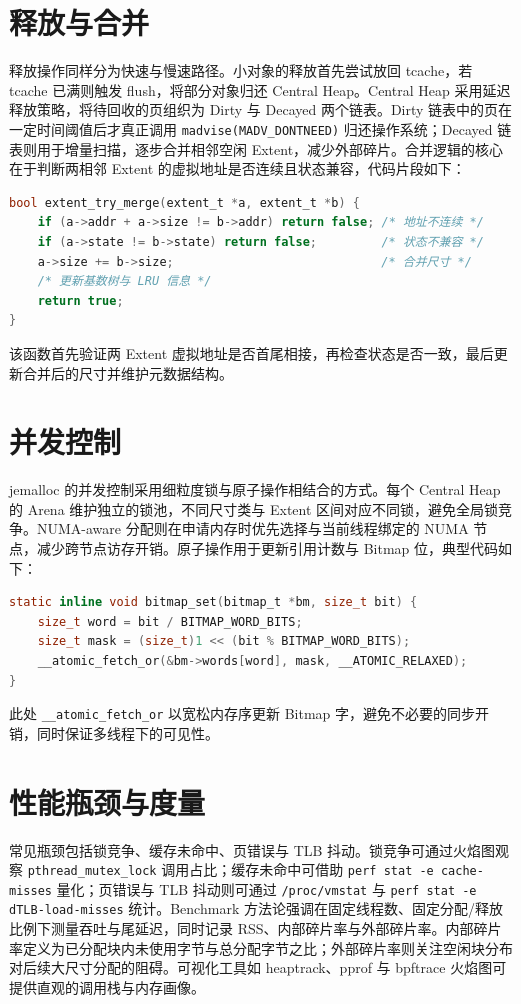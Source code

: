 \chapter{释放与合并}
释放操作同样分为快速与慢速路径。小对象的释放首先尝试放回 tcache，若 tcache 已满则触发 flush，将部分对象归还 Central Heap。Central Heap 采用延迟释放策略，将待回收的页组织为 Dirty 与 Decayed 两个链表。Dirty 链表中的页在一定时间阈值后才真正调用 \texttt{madvise(MADV\_{}DONTNEED)} 归还操作系统；Decayed 链表则用于增量扫描，逐步合并相邻空闲 Extent，减少外部碎片。合并逻辑的核心在于判断两相邻 Extent 的虚拟地址是否连续且状态兼容，代码片段如下：\par
\begin{lstlisting}[language=c]
bool extent_try_merge(extent_t *a, extent_t *b) {
    if (a->addr + a->size != b->addr) return false; /* 地址不连续 */
    if (a->state != b->state) return false;         /* 状态不兼容 */
    a->size += b->size;                             /* 合并尺寸 */
    /* 更新基数树与 LRU 信息 */
    return true;
}
\end{lstlisting}
该函数首先验证两 Extent 虚拟地址是否首尾相接，再检查状态是否一致，最后更新合并后的尺寸并维护元数据结构。\par
\chapter{并发控制}
jemalloc 的并发控制采用细粒度锁与原子操作相结合的方式。每个 Central Heap 的 Arena 维护独立的锁池，不同尺寸类与 Extent 区间对应不同锁，避免全局锁竞争。NUMA-aware 分配则在申请内存时优先选择与当前线程绑定的 NUMA 节点，减少跨节点访存开销。原子操作用于更新引用计数与 Bitmap 位，典型代码如下：\par
\begin{lstlisting}[language=c]
static inline void bitmap_set(bitmap_t *bm, size_t bit) {
    size_t word = bit / BITMAP_WORD_BITS;
    size_t mask = (size_t)1 << (bit % BITMAP_WORD_BITS);
    __atomic_fetch_or(&bm->words[word], mask, __ATOMIC_RELAXED);
}
\end{lstlisting}
此处 \texttt{\_{}\_{}atomic\_{}fetch\_{}or} 以宽松内存序更新 Bitmap 字，避免不必要的同步开销，同时保证多线程下的可见性。\par
\chapter{性能瓶颈与度量}
常见瓶颈包括锁竞争、缓存未命中、页错误与 TLB 抖动。锁竞争可通过火焰图观察 \texttt{pthread\_{}mutex\_{}lock} 调用占比；缓存未命中可借助 \texttt{perf stat -e cache-misses} 量化；页错误与 TLB 抖动则可通过 \texttt{/proc/vmstat} 与 \texttt{perf stat -e dTLB-load-misses} 统计。Benchmark 方法论强调在固定线程数、固定分配/释放比例下测量吞吐与尾延迟，同时记录 RSS、内部碎片率与外部碎片率。内部碎片率定义为已分配块内未使用字节与总分配字节之比；外部碎片率则关注空闲块分布对后续大尺寸分配的阻碍。可视化工具如 heaptrack、pprof 与 bpftrace 火焰图可提供直观的调用栈与内存画像。\par
